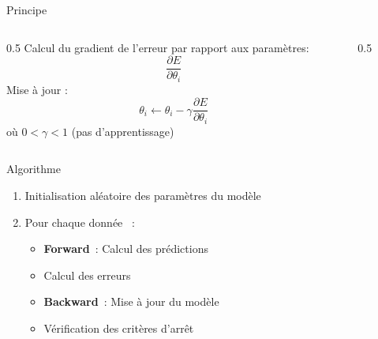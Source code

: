\begin{frame}{Principe}
  \begin{columns}
    \begin{column}{0.5\tw}
      Calcul du gradient de l'erreur par rapport aux paramètres:
      \[
        \frac{\partial{E}}{\partial{\theta_i}}
      \]
      Mise à jour :
      \[
        \theta_i \leftarrow \theta_i - \gamma\frac{\partial{E}}{\partial{\theta_i}}
      \]
      où $0 < \gamma < 1$ (pas d'apprentissage)
    \end{column}
    \begin{column}{0.5\tw}
    \end{column}
  \end{columns}
\end{frame}

\begin{frame}{Algorithme}
  \begin{enumerate}
    \item Initialisation aléatoire des paramètres du modèle
    \item Pour chaque donnée ~:
    \begin{itemize}
        \item \textbf{Forward}~: Calcul des prédictions 
        \item Calcul des erreurs
        \item \textbf{Backward}~: Mise à jour du modèle
        

        \item Vérification des critères d'arrêt
    \end{itemize}
  \end{enumerate}
\end{frame}
